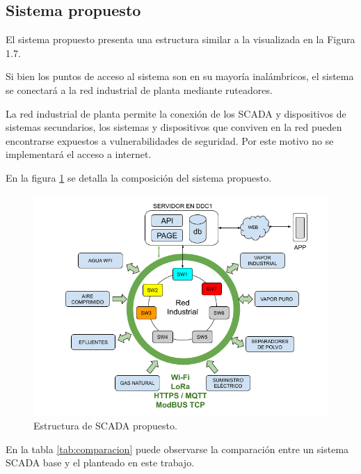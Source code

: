  
 \subsection{Sistema propuesto}

El sistema propuesto presenta una estructura similar a la visualizada en la Figura 1.7.

Si bien los puntos de acceso al sistema son en su mayoría inalámbricos, el sistema se conectará a la red industrial de planta mediante ruteadores. 

La red industrial de planta permite la conexión de los SCADA y dispositivos de sistemas secundarios, los sistemas y dispositivos que conviven en la red pueden encontrarse expuestos a vulnerabilidades de seguridad. Por este motivo no se implementará el acceso a internet.


En la figura \ref{fig:SCPROY} se detalla la composición del sistema propuesto.

\begin{figure}[htbp]
	\centering
	\includegraphics[width=1.05\textwidth]{./Figures/RED.png}
	\caption{Estructura de SCADA propuesto.}
	\label{fig:SCPROY}
\end{figure}

En la tabla \ref{tab:comparacion} puede observarse la comparación entre un sistema SCADA base y el planteado en este trabajo.

